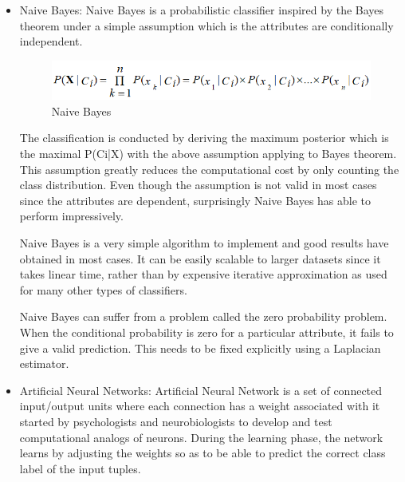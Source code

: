 \begin{itemize}
\begin{itemize}
        \item Naive Bayes:
                Naive Bayes is a probabilistic classifier inspired by the Bayes theorem under a simple assumption which is the attributes are conditionally independent.\\
                    \begin{figure}[htbp]
                        \centering
	                    \includegraphics[scale=0.5]{Figures/naive_bayes.png}
                        \caption[Naive Bayes]{Naive Bayes}
	                    \label{fig:Naive Bayes}
                    \end{figure}
                The classification is conducted by deriving the maximum posterior which is the maximal P(Ci|X) with the above assumption applying to Bayes theorem. This assumption greatly reduces the computational cost by only counting the class distribution. Even though the assumption is not valid in most cases since the attributes are dependent, surprisingly Naive Bayes has able to perform impressively.

                Naive Bayes is a very simple algorithm to implement and good results have obtained in most cases. It can be easily scalable to larger datasets since it takes linear time, rather than by expensive iterative approximation as used for many other types of classifiers.

                Naive Bayes can suffer from a problem called the zero probability problem. When the conditional probability is zero for a particular attribute, it fails to give a valid prediction. This needs to be fixed explicitly using a Laplacian estimator.
                
        \item Artificial Neural Networks:
                Artificial Neural Network is a set of connected input/output units where each connection has a weight associated with it started by psychologists and neurobiologists to develop and test computational analogs of neurons. During the learning phase, the network learns by adjusting the weights so as to be able to predict the correct class label of the input tuples.


\end{itemize}
\end{itemize}
